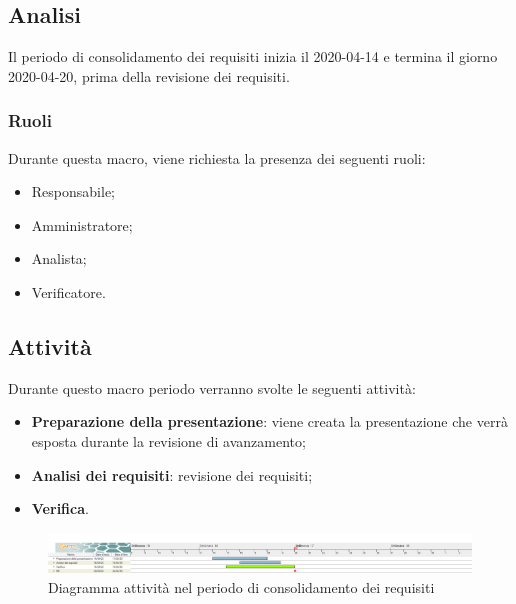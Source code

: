 \documentclass[../piano-di-progetto.tex]{subfiles}
\begin{document}
\subsection{Analisi}
Il periodo di consolidamento dei requisiti inizia il 2020-04-14 e termina il giorno 2020-04-20, prima della revisione dei requisiti. 

\subsubsection{Ruoli}
Durante questa macro, viene richiesta la presenza dei seguenti ruoli:
\begin{itemize}
    \item Responsabile;
    \item Amministratore;
    \item Analista;
    \item Verificatore.
\end{itemize}

\subsection{Attività}
Durante questo macro periodo verranno svolte le seguenti attività:
\begin{itemize}
    \item \textbf{Preparazione della presentazione}: viene creata la presentazione che verrà esposta durante la revisione di avanzamento;
    \item \textbf{Analisi dei requisiti}: revisione dei requisiti;
    \item \textbf{Verifica}.
\end{itemize}


\newpage
\begin{landscape}
    \begin{figure}[H]
        \centering
        \includegraphics[width=24cm]{img/consolidamento.png}
        \caption{Diagramma attività nel periodo di consolidamento dei requisiti}
      \end{figure}
\end{landscape}
\end{document}

